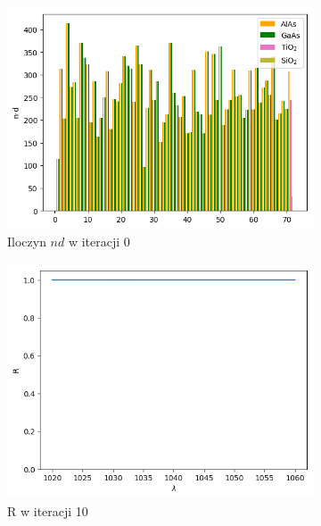 \begin{figure} [H]
\begin{subfigure}[b]{0.32\textwidth}
        \includegraphics[width=\linewidth]{figures/wyniki/1stopien/opt10^5/result_ndresult0.png}
        \caption{Iloczyn $nd$ w iteracji 0}
    \end{subfigure}
        \begin{subfigure}[b]{0.30\textwidth}
        \includegraphics[width=\linewidth]{figures/wyniki/1stopien/opt10^5/result_Rresult10.png}
        \caption{R w iteracji 10}
    \end{subfigure}
        \begin{subfigure}[b]{0.31\textwidth}

\end{subfigure}
\end{figure}
